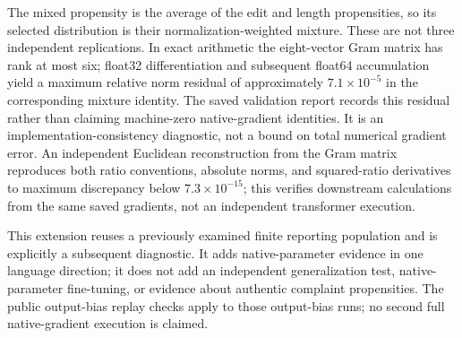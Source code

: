 The mixed propensity is the average of the edit and length propensities, so its selected distribution is their normalization-weighted mixture. These are not three independent replications. In exact arithmetic the eight-vector Gram matrix has rank at most six; float32 differentiation and subsequent float64 accumulation yield a maximum relative norm residual of approximately $7.1\times10^{-5}$ in the corresponding mixture identity. The saved validation report records this residual rather than claiming machine-zero native-gradient identities. It is an implementation-consistency diagnostic, not a bound on total numerical gradient error. An independent Euclidean reconstruction from the Gram matrix reproduces both ratio conventions, absolute norms, and squared-ratio derivatives to maximum discrepancy below $7.3\times10^{-15}$; this verifies downstream calculations from the same saved gradients, not an independent transformer execution.

This extension reuses a previously examined finite reporting population and is explicitly a subsequent diagnostic. It adds native-parameter evidence in one language direction; it does not add an independent generalization test, native-parameter fine-tuning, or evidence about authentic complaint propensities. The public output-bias replay checks apply to those output-bias runs; no second full native-gradient execution is claimed.
